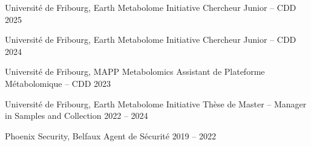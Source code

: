 

\begin{cventries}


\cventrynoloc
  {Université de Fribourg, Earth Metabolome Initiative} %
  {Chercheur Junior – CDD} %
  {2025} %
  {}

\cventrynoloc
  {Université de Fribourg, Earth Metabolome Initiative} %
  {Chercheur Junior – CDD} %
  {2024} %
  {}

\cventrynoloc
  {Université de Fribourg, MAPP Metabolomics} %
  {Assistant de Plateforme Métabolomique – CDD} %
  {2023} %
  {}

\cventrynoloc
  {Université de Fribourg, Earth Metabolome Initiative} %
  {Thèse de Master – Manager in Samples and Collection} %
  {2022 -- 2024} %
  {}

\cventrynoloc
  {Phoenix Security, Belfaux} %
  {Agent de Sécurité} %
  {2019 -- 2022} %
  {}

\end{cventries}
